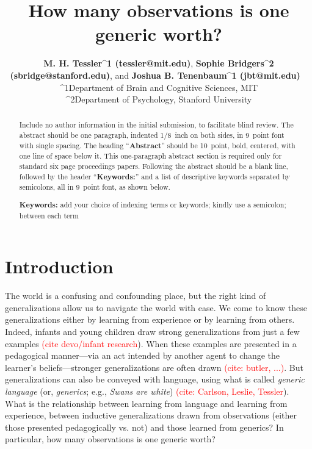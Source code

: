 \documentclass[10pt,letterpaper]{article}
\title{How many observations is one generic worth?}
\author{{\large \bf M. H. Tessler^{1} (tessler@mit.edu)}, {\large \bf Sophie Bridgers^{2} (sbridge@stanford.edu)}, and {\large \bf Joshua B. Tenenbaum^{1} (jbt@mit.edu)} \ \\
  ^{1}Department of Brain and Cognitive Sciences, MIT \\
    ^{2}Department of Psychology, Stanford University}
\newcommand{\red}[1]{\textcolor{Red}{#1}}
\begin{document}
\maketitle


\begin{abstract}
Include no author information in the initial submission, to facilitate
blind review.  The abstract should be one paragraph, indented 1/8~inch on both sides,
in 9~point font with single spacing. The heading ``{\bf Abstract}''
should be 10~point, bold, centered, with one line of space below
it. This one-paragraph abstract section is required only for standard
six page proceedings papers. Following the abstract should be a blank
line, followed by the header ``{\bf Keywords:}'' and a list of
descriptive keywords separated by semicolons, all in 9~point font, as
shown below.

\textbf{Keywords:} 
add your choice of indexing terms or keywords; kindly use a
semicolon; between each term
\end{abstract}


\section{Introduction}

The world is a confusing and confounding place, but the right kind of generalizations allow us to navigate the world with ease.
We come to know these generalizations either by learning from experience or by learning from others.
Indeed, infants and young children draw strong generalizations from just a few examples \red{(cite devo/infant research}).
When these examples are presented in a pedagogical manner---via an act intended by another agent to change the learner's beliefs---stronger generalizations are often drawn \red{(cite: butler, ...)}. 
But generalizations can also be conveyed with language, using what is called \emph{generic language} (or, \emph{generics}; e.g., \emph{Swans are white}) \red{(cite: Carlson, Leslie, Tessler}).
What is the relationship between learning from language and learning from experience, between inductive generalizations drawn from observations (either those presented pedagogically vs. not) and those learned from generics?
In particular, how many observations is one generic worth?

\end{document}
